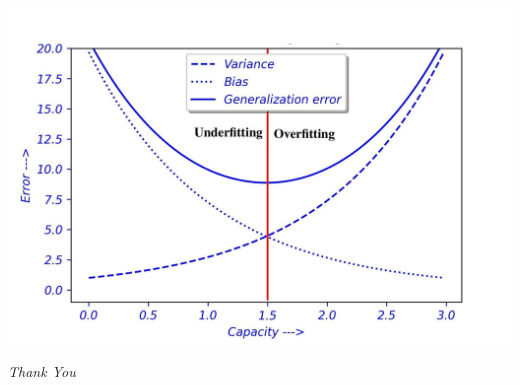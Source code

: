 \documentclass[12pt,aspectratio=169]{beamer}
\begin{document}
\begin{frame}
\begin{center}
\includegraphics[scale=0.8]{Bias}
\end{center}
\end{frame}

\begin{frame}{}
  \centering \Huge
  \emph{Thank You}
\end{frame}
\end{document}
